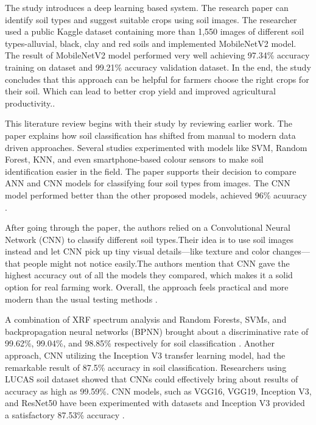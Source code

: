 \documentclass[conference]{IEEEtran}
\begin{document}
The study introduces a deep learning based system. The research paper can identify soil types and suggest suitable crops using soil images. The researcher used a public Kaggle dataset containing more than 1,550 images of different soil types-alluvial, black, clay and red soils and implemented MobileNetV2 model. The result of MobileNetV2 model performed very well achieving 97.34\% accuracy training on dataset and 99.21\% accuracy validation dataset. In the end, the study concludes that this approach can be helpful for farmers choose the right crops for their soil. Which can lead to better crop yield and improved agricultural productivity.\cite{b1}.
\vspace{5pt}


This literature review begins with their study by reviewing earlier work. The paper explains how soil classification has shifted from manual to modern data driven approaches. Several studies experimented with models like SVM, Random Forest, KNN, and even smartphone-based colour sensors to make soil identification easier in the field. The paper supports their decision to compare ANN and CNN models for classifying four soil types from images. The CNN model performed better than the other proposed models, achieved 96\% acuuracy \cite{b2}.
\vspace{5pt}


After going through the paper, the authors relied on a Convolutional Neural Network (CNN) to classify different soil types.Their idea is to use soil images instead and let CNN pick up tiny visual details—like texture and color changes—that people might not notice easily.The authors mention that CNN gave the highest accuracy out of all the models they compared, which makes it a solid option for real farming work. Overall, the approach feels practical and more modern than the usual testing methods \cite{b3}.
\vspace{5pt}


A combination of XRF spectrum analysis and Random Forests, SVMs, and backpropagation neural networks (BPNN) brought about a discriminative rate of 99.62\%, 99.04\%, and 98.85\% respectively for soil classification \cite{b5}. Another approach, CNN utilizing the Inception V3 transfer learning model, had the remarkable result of 87.5\% accuracy in soil classification. Researchers using LUCAS soil dataset showed that CNNs could effectively bring about results of accuracy as high as 99.59\%. CNN models, such as VGG16, VGG19, Inception V3, and ResNet50 have been experimented with datasets and Inception V3 provided a satisfactory 87.53\% accuracy \cite{b4}.
\vspace{5pt}
\end{document}
